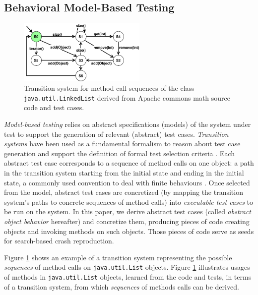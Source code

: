 \subsection{Behavioral Model-Based Testing}

 \begin{figure}[!t]
    \centering
    \includegraphics[width=0.55\textwidth]{papers/model_seeding/figures/list.pdf}
    \caption{Transition system for method call sequences of the class \texttt{java.util.LinkedList} derived from Apache commons math source code and test cases.}
    \label{fig:list}
\end{figure}

\textit{Model-based testing} \cite{Utting2007} relies on abstract specifications (models) of the system under test to support the generation of relevant (abstract) test cases.  \textit{Transition systems} \cite{Baier2007} have been used as a fundamental formalism to reason about test case generation and support the definition of formal test selection criteria \cite{Tretmans2008}.
%
Each abstract test case corresponds to a sequence of method calls on one object: \ie a path in the transition system starting from the initial state and ending in the initial state, a commonly used convention to deal with finite behaviours \cite{Devroey2017b}.
Once selected from the model, abstract test cases are concretized (by mapping the transition system's paths to concrete sequences of method calls) into \emph{executable test cases} to be run on the system.
In this paper, we derive abstract test cases (called \emph{abstract object behavior} hereafter) and concretize them, producing pieces of code creating objects and invoking methods on such objects. Those pieces of code serve as seeds for search-based crash reproduction.

Figure \ref{fig:list} shows an example of a transition system representing the possible \emph{sequences} of method calls on \texttt{java.util.List} objects. Figure  \ref{fig:list} illustrates usages of methods in \texttt{java.util.List} objects, learned from the code and tests, in terms of a transition system, from which \textit{sequences} of methods calls can be derived.
%

